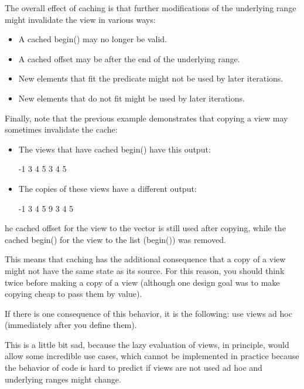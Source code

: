 The overall effect of caching is that further modifications of the underlying range might invalidate the view in various ways:

\begin{itemize}
\item
A cached begin() may no longer be valid.

\item
A cached offset may be after the end of the underlying range.

\item
New elements that fit the predicate might not be used by later iterations.

\item
New elements that do not fit might be used by later iterations.
\end{itemize}


Finally, note that the previous example demonstrates that copying a view may sometimes invalidate the cache:

\begin{itemize}
\item
The views that have cached begin() have this output:

{\footnotesize
\begin{shell}
-1 3 4 5
3 4 5
\end{shell}
}

\item
The copies of these views have a different output:

{\footnotesize
\begin{shell}
-1 3 4 5
9 3 4 5
\end{shell}
}
\end{itemize}

he cached offset for the view to the vector is still used after copying, while the cached begin() for the view to the list (begin()) was removed.

This means that caching has the additional consequence that a copy of a view might not have the same state as its source. For this reason, you should think twice before making a copy of a view (although one design goal was to make copying cheap to pass them by value).

If there is one consequence of this behavior, it is the following: use views ad hoc (immediately after you define them).

This is a little bit sad, because the lazy evaluation of views, in principle, would allow some incredible use cases, which cannot be implemented in practice because the behavior of code is hard to predict if views are not used ad hoc and underlying ranges might change.

